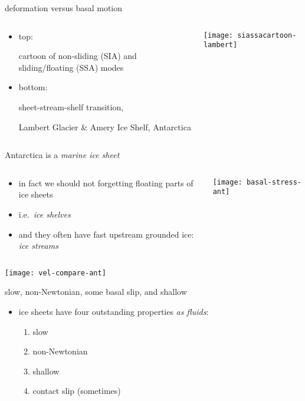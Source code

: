 \documentclass[hide notes,intlimits]{beamer}
\begin{document}
\begin{frame}{deformation versus basal motion}

\begin{columns}
\begin{column}{0.3\textwidth}
\small
\begin{itemize}
\item \alert{top:}

cartoon of non-sliding (SIA) and sliding/floating (SSA) modes
\item \alert{bottom:}

sheet-stream-shelf transition,

Lambert Glacier \& Amery Ice Shelf, Antarctica
\end{itemize}
\end{column}

\begin{column}{0.7\textwidth}
\texttt{[image: siassacartoon-lambert]}
\end{column}
\end{columns}
\end{frame}


\begin{frame}{Antarctica is a \emph{marine ice sheet}}

\begin{columns}
\begin{column}{0.55\textwidth}
\small
\begin{itemize}
\item in fact we should not forgetting floating parts of ice sheets
\item i.e.~\emph{ice shelves}
\item and they often have fast upstream grounded ice: \emph{ice streams}
\end{itemize}
\end{column}

\begin{column}{0.45\textwidth}
\texttt{[image: basal-stress-ant]}
\end{column}
\end{columns}

\begin{center}
\texttt{[image: vel-compare-ant]}
\end{center}
\end{frame}


\begin{frame}{slow, non-Newtonian, some basal slip, and shallow}

\begin{itemize}
\item ice sheets have four outstanding properties \emph{as fluids}:
  \begin{enumerate}
  \item slow
  \item non-Newtonian
  \item \alert{shallow}
  \item contact slip (sometimes)
  \end{enumerate}
\end{itemize}
\end{frame}
\end{document}
